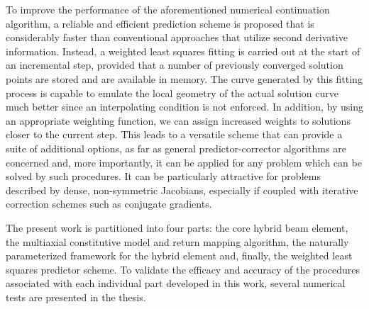 To improve the performance of the aforementioned numerical continuation algorithm, a 
reliable and efficient prediction scheme is proposed that is considerably faster than 
conventional approaches that utilize second derivative information. Instead, a 
weighted least squares fitting is carried out at the start of an incremental step, 
provided that a number of previously converged solution points are stored and 
are  available in 
memory. The curve generated by this fitting process is capable to emulate the local 
geometry of the actual solution curve much better since an interpolating condition is 
not enforced. In addition, by using an appropriate weighting function, we can assign 
increased weights to solutions closer to the current step. This leads to a versatile 
scheme that can provide a suite of additional options, as far as general 
predictor-corrector algorithms are concerned and, more importantly, it can be applied 
for any problem which can be solved by such procedures. It can be particularly 
attractive for problems described by dense, non-symmetric Jacobians, especially 
if 
coupled with iterative correction schemes such as conjugate gradients.

The present work is partitioned into four parts: the core hybrid beam element, 
the 
multiaxial constitutive model and return mapping algorithm, the naturally 
parameterized framework for the hybrid element and, finally, the weighted least 
squares predictor scheme. To validate the efficacy and accuracy of the 
procedures associated 
with each individual part developed in this work, several numerical tests are 
presented in the thesis. 